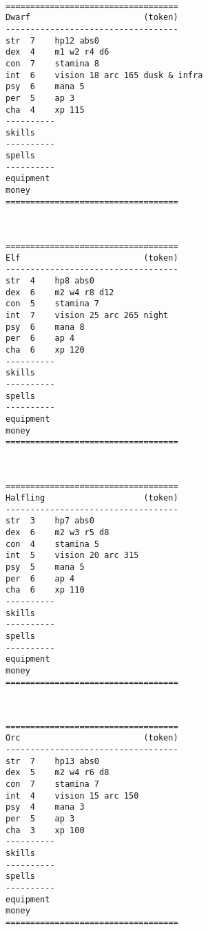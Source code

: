 \

\goodbreak \small \begin{samepage} \begin{verbatim}
===================================
Dwarf                       (token)
-----------------------------------
str  7    hp12 abs0
dex  4    m1 w2 r4 d6
con  7    stamina 8
int  6    vision 18 arc 165 dusk & infra
psy  6    mana 5
per  5    ap 3
cha  4    xp 115
----------
skills
----------
spells
----------
equipment
money
===================================
\end{verbatim} \end{samepage} \normalsize

\

\goodbreak \small \begin{samepage} \begin{verbatim}
===================================
Elf                         (token)
-----------------------------------
str  4    hp8 abs0
dex  6    m2 w4 r8 d12
con  5    stamina 7
int  7    vision 25 arc 265 night
psy  6    mana 8
per  6    ap 4
cha  6    xp 120
----------
skills
----------
spells
----------
equipment
money
===================================
\end{verbatim} \end{samepage} \normalsize

\

\goodbreak \small \begin{samepage} \begin{verbatim}
===================================
Halfling                    (token)
-----------------------------------
str  3    hp7 abs0
dex  6    m2 w3 r5 d8
con  4    stamina 5
int  5    vision 20 arc 315
psy  5    mana 5
per  6    ap 4
cha  6    xp 110
----------
skills
----------
spells
----------
equipment
money
===================================
\end{verbatim} \end{samepage} \normalsize

\


\goodbreak \small \begin{samepage} \begin{verbatim}
===================================
Orc                         (token)
-----------------------------------
str  7    hp13 abs0
dex  5    m2 w4 r6 d8
con  7    stamina 7
int  4    vision 15 arc 150
psy  4    mana 3
per  5    ap 3
cha  3    xp 100
----------
skills
----------
spells
----------
equipment
money
===================================
\end{verbatim} \end{samepage} \normalsize

